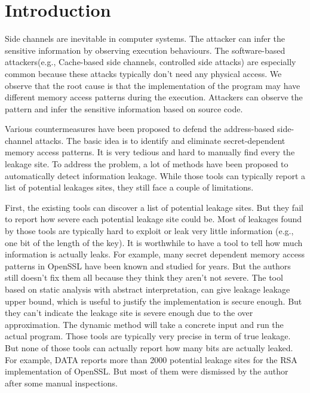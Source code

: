 \section{Introduction}

Side channels are inevitable in computer systems. The attacker can infer the sensitive 
information by observing execution behaviours. The software-based attackers(e.g., Cache-based 
side channels, controlled side attacks) are especially common because these attacks typically 
don’t need any physical access. We observe that the root cause is that the implementation of 
the program may have different memory access patterns during the execution. Attackers can 
observe the pattern and infer the sensitive information based on source code.

Various countermeasures have been proposed to defend the address-based side-channel attacks. 
The basic idea is to identify and eliminate secret-dependent memory access patterns. 
It is very tedious and hard to manually find every the leakage site. To address the problem, 
a lot of methods have been proposed to automatically detect information leakage. 
While those tools can typically report a list of potential leakages sites, they still 
face a couple of limitations.

First, the existing tools \cite{203878} \cite{217537} can discover a list of potential leakage sites. 
But they fail to report how severe each potential leakage site could be. Most of leakages 
found by those tools are typically hard to exploit or leak very little information (e.g., one bit of
the length of the key).  It is worthwhile to have a tool to tell how much information is actually leaks. 
For example, many secret dependent memory access patterns in OpenSSL have been known 
and studied for years. But the authors still doesn’t fix them all because they think 
they aren’t not severe. The tool based on static analysis with abstract interpretation, 
can give leakage leakage upper bound, which is useful to justify the implementation is 
secure enough. But they can’t indicate the leakage site is severe enough due to the over 
approximation. The dynamic method will take a concrete input and run the actual program. 
Those tools are typically very precise in term of true leakage. But none of those tools 
can actually report how many bits are actually leaked. For example, DATA\cite{217537} reports more 
than 2000 potential leakage sites for the RSA implementation of OpenSSL. But most of 
them were dismissed by the author after some manual inspections.

